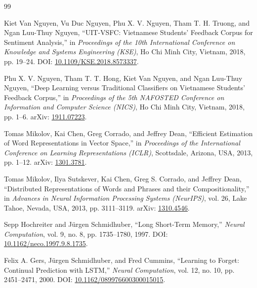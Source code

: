\documentclass[12pt,a4paper]{article}
\begin{document}
\begingroup
\renewcommand{\section}[2]{}%
\begin{thebibliography}{99}
\setlength{\itemsep}{6pt}
\sloppy

 Kiet Van Nguyen, Vu Duc Nguyen, Phu X. V. Nguyen, Tham T. H. Truong, and Ngan Luu-Thuy Nguyen, “UIT-VSFC: Vietnamese Students’ Feedback Corpus for Sentiment Analysis,” in \textit{Proceedings of the 10th International Conference on Knowledge and Systems Engineering (KSE)}, Ho Chi Minh City, Vietnam, 2018, pp. 19--24. DOI: \href{https://doi.org/10.1109/KSE.2018.8573337}{10.1109/KSE.2018.8573337}.

 Phu X. V. Nguyen, Tham T. T. Hong, Kiet Van Nguyen, and Ngan Luu-Thuy Nguyen, “Deep Learning versus Traditional Classifiers on Vietnamese Students’ Feedback Corpus,” in \textit{Proceedings of the 5th NAFOSTED Conference on Information and Computer Science (NICS)}, Ho Chi Minh City, Vietnam, 2018, pp. 1--6. arXiv: \href{https://arxiv.org/abs/1911.07223}{1911.07223}.

 Tomas Mikolov, Kai Chen, Greg Corrado, and Jeffrey Dean, “Efficient Estimation of Word Representations in Vector Space,” in \textit{Proceedings of the International Conference on Learning Representations (ICLR)}, Scottsdale, Arizona, USA, 2013, pp. 1--12. arXiv: \href{https://arxiv.org/abs/1301.3781}{1301.3781}.

 Tomas Mikolov, Ilya Sutskever, Kai Chen, Greg S. Corrado, and Jeffrey Dean, “Distributed Representations of Words and Phrases and their Compositionality,” in \textit{Advances in Neural Information Processing Systems (NeurIPS)}, vol. 26, Lake Tahoe, Nevada, USA, 2013, pp. 3111--3119. arXiv: \href{https://arxiv.org/abs/1310.4546}{1310.4546}.

 Sepp Hochreiter and Jürgen Schmidhuber, “Long Short-Term Memory,” \textit{Neural Computation}, vol. 9, no. 8, pp. 1735--1780, 1997. DOI: \href{https://doi.org/10.1162/neco.1997.9.8.1735}{10.1162/neco.1997.9.8.1735}.

 Felix A. Gers, Jürgen Schmidhuber, and Fred Cummins, “Learning to Forget: Continual Prediction with LSTM,” \textit{Neural Computation}, vol. 12, no. 10, pp. 2451--2471, 2000. DOI: \href{https://doi.org/10.1162/089976600300015015}{10.1162/089976600300015015}.


\end{thebibliography}
\end{document}
